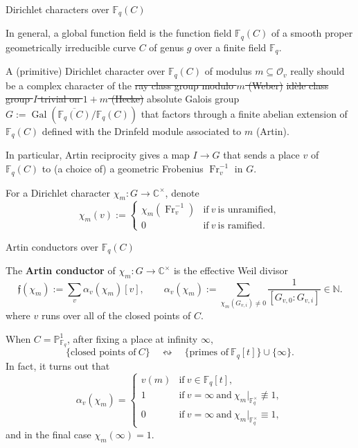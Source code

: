 \documentclass[10pt]{beamer}
\begin{document}
\begin{frame}[t]{Dirichlet characters over $ \mathbb{F}_q(C) $}

In general, a global function field is the function field $ \mathbb{F}_q(C) $ of a smooth proper geometrically irreducible curve $ C $ of genus $ g $ over a finite field $ \mathbb{F}_q $.

\vspace{0.5cm} A (primitive) Dirichlet character over $ \mathbb{F}_q(C) $ of modulus $ m \subseteq \mathcal{O}_v $ really should be a complex character of the \st{ray class group modulo $ m $ (Weber)} \st{id\`ele class group $ I $ trivial on $ 1 + m $ (Hecke)} absolute Galois group $ G := \operatorname{Gal}(\overline{\mathbb{F}_q(C)} / \mathbb{F}_q(C)) $ that factors through a finite abelian extension of $ \mathbb{F}_q(C) $ defined with the Drinfeld module associated to $ m $ (Artin).

\vspace{0.5cm} In particular, Artin reciprocity gives a map $ I \to G $ that sends a place $ v $ of $ \mathbb{F}_q(C) $ to (a choice of) a geometric Frobenius $ \operatorname{Fr}_v^{-1} $ in $ G $.

\vspace{0.5cm} For a Dirichlet character $ \chi_m : G \to \mathbb{C}^\times $, denote
$$ \chi_m(v) :=
\begin{cases}
\chi_m(\operatorname{Fr}_v^{-1}) & \text{if} \ v \ \text{is unramified}, \\
0 & \text{if} \ v \ \text{is ramified}.
\end{cases}
$$

\end{frame}

\begin{frame}[t]{Artin conductors over $ \mathbb{F}_q(C) $}

The \textbf{Artin conductor} of $ \chi_m : G \to \mathbb{C}^\times $ is the effective Weil divisor
$$ \mathfrak{f}(\chi_m) := \sum_v \alpha_v(\chi_m)[v], \qquad \alpha_v(\chi_m) := \sum_{\chi_m(G_{v, i}) \ne 0} \dfrac{1}{[G_{v, 0} : G_{v, i}]} \in \mathbb{N}. $$
where $ v $ runs over all of the closed points of $ C $.

\vspace{0.5cm} When $ C = \mathbb{P}_{\mathbb{F}_q}^1 $, after fixing a place at infinity $ \infty $,
$$ \{\text{closed points of} \ C\} \quad \leftrightsquigarrow \quad \{\text{primes of} \ \mathbb{F}_q[t]\} \cup \{\infty\}. $$
In fact, it turns out that
$$ \alpha_v(\chi_m) =
\begin{cases}
v(m) & \text{if} \ v \in \mathbb{F}_q[t], \\
1 & \text{if} \ v = \infty \ \text{and} \ \chi_m|_{\mathbb{F}_q^\times} \not\equiv 1, \\
0 & \text{if} \ v = \infty \ \text{and} \ \chi_m|_{\mathbb{F}_q^\times} \equiv 1,
\end{cases}
$$
and in the final case $ \chi_m(\infty) = 1 $.

\end{frame}
\end{document}
